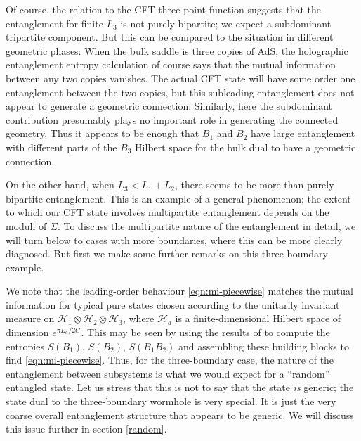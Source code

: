 \documentclass[12pt]{article}
\numberwithin{equation}{section}
\begin{document}
Of course, the relation to the CFT three-point function suggests that the entanglement for finite $L_3$ is not purely bipartite; we expect a subdominant tripartite component. But this can be compared to the situation in different geometric phases: When the bulk saddle is three copies of AdS, the holographic entanglement entropy calculation of course says that the mutual information between any two copies vanishes.  The actual CFT state will have some order one entanglement between the two copies, but this subleading entanglement does not appear to generate a geometric connection. Similarly, here the subdominant contribution presumably plays no important role in generating the connected geometry. Thus it appears to be enough that $B_1$ and $B_2$ have large entanglement with different parts of the $B_3$ Hilbert space for the bulk dual to have a geometric connection.

On the other hand, when $L_3 < L_1 + L_2$, there seems to be more than purely bipartite entanglement. This is an example of a general phenomenon; the extent to which our CFT state involves multipartite entanglement depends on the moduli of $\Sigma$. To discuss the multipartite nature of the entanglement in detail, we will turn below to cases with more boundaries, where this can be more clearly diagnosed. But first we make some further remarks on this three-boundary example.


We note that the leading-order behaviour \eqref{eqn:mi-piecewise} matches the mutual information for typical pure states chosen according to the unitarily invariant measure on $\overline{\mathcal{H}}_1 \otimes \overline{\mathcal{H}}_2 \otimes \overline{\mathcal{H}}_3$, where $\overline{\mathcal{H}}_a$ is a finite-dimensional Hilbert space of dimension $e^{\pi L_a/2G}$. This may be seen by using the results of \cite{Page:1993df} to compute the entropies $S(B_1)$, $S(B_2)$, $S(B_1B_2)$ and assembling these building blocks to find \eqref{eqn:mi-piecewise}. Thus, for the three-boundary case, the nature of the entanglement between subsystems is what we would expect for a ``random'' entangled state. Let us stress that this is not to say that the state \emph{is} generic; the state dual to the three-boundary wormhole is very special. It is just the very coarse overall entanglement structure that appears to be generic. We will discuss this issue further in section \ref{random}.
\end{document}
